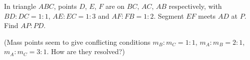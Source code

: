 In triangle $ABC$, points $D$, $E$, $F$ are on $BC$, $AC$, $AB$ respectively, with $BD:DC=1:1$, $AE:EC=1:3$ and $AF:FB=1:2$. Segment $EF$ meets $AD$ at $P$. Find $AP:PD$.

(Mass points seem to give conflicting conditions $m_B:m_C=1:1$, $m_A:m_B=2:1$, $m_A:m_C=3:1$. How are they resolved?)
